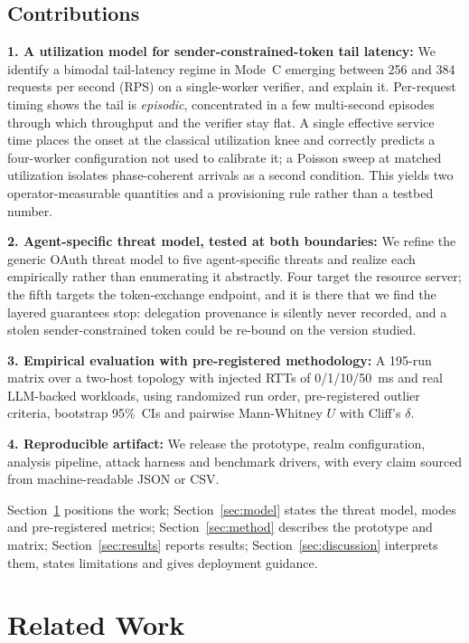\documentclass[conference]{IEEEtran}
\begin{document}
\subsection{Contributions}

\textbf{1. A utilization model for sender-constrained-token tail latency:} We identify a bimodal tail-latency regime in Mode~C emerging between 256 and 384 requests per second (RPS) on a single-worker verifier, and explain it. Per-request timing shows the tail is \emph{episodic}, concentrated in a few multi-second episodes through which throughput and the verifier stay flat. A single effective service time places the onset at the classical utilization knee and correctly predicts a four-worker configuration not used to calibrate it; a Poisson sweep at matched utilization isolates phase-coherent arrivals as a second condition. This yields two operator-measurable quantities and a provisioning rule rather than a testbed number.

\textbf{2. Agent-specific threat model, tested at both boundaries:} We refine the generic OAuth threat model to five agent-specific threats and realize each empirically rather than enumerating it abstractly. Four target the resource server; the fifth targets the token-exchange endpoint, and it is there that we find the layered guarantees stop: delegation provenance is silently never recorded, and a stolen sender-constrained token could be re-bound on the version studied.

\textbf{3. Empirical evaluation with pre-registered methodology:} A 195-run matrix over a two-host topology with injected RTTs of 0/1/10/50~ms and real LLM-backed workloads, using randomized run order, pre-registered outlier criteria, bootstrap 95\%~CIs and pairwise Mann-Whitney $U$ with Cliff's $\delta$.

\textbf{4. Reproducible artifact:} We release the prototype, realm configuration, analysis pipeline, attack harness and benchmark drivers, with every claim sourced from machine-readable JSON or CSV.

Section~\ref{sec:related} positions the work; Section~\ref{sec:model} states the threat model, modes and pre-registered metrics; Section~\ref{sec:method} describes the prototype and matrix; Section~\ref{sec:results} reports results; Section~\ref{sec:discussion} interprets them, states limitations and gives deployment guidance.

\section{Related Work}
\label{sec:related}
\end{document}
